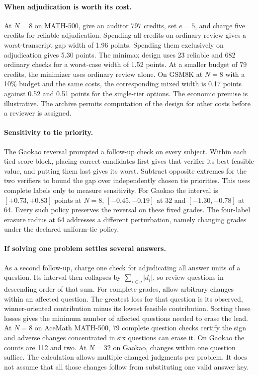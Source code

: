\paragraph{When adjudication is worth its cost.}
At $N=8$ on MATH-500, give an auditor 797 credits, set $e=5$, and charge five credits for reliable adjudication. Spending all credits on ordinary review gives a worst-transcript gap width of 1.96 points. Spending them exclusively on adjudication gives 5.30 points. The minimax design uses 23 reliable and 682 ordinary checks for a worst-case width of 1.52 points. At a smaller budget of 79 credits, the minimizer uses ordinary review alone. On GSM8K at $N=8$ with a 10\% budget and the same costs, the corresponding mixed width is 0.17 points against 0.52 and 0.51 points for the single-tier options. The economic premise is illustrative. The archive permits computation of the design for other costs before a reviewer is assigned.


\paragraph{Sensitivity to tie priority.}
The Gaokao reversal prompted a follow-up check on every subject. Within each tied score block, placing correct candidates first gives that verifier its best feasible value, and putting them last gives its worst. Subtract opposite extremes for the two verifiers to bound the gap over independently chosen tie priorities. This uses complete labels only to measure sensitivity. For Gaokao the interval is $[+0.73,+0.83]$ points at $N=8$, $[-0.45,-0.19]$ at 32 and $[-1.30,-0.78]$ at 64. Every such policy preserves the reversal on these fixed grades. The four-label erasure radius at 64 addresses a different perturbation, namely changing grades under the declared uniform-tie policy.

\paragraph{If solving one problem settles several answers.}
As a second follow-up, charge one check for adjudicating all answer units of a question. Its interval then collapses by $\sum_{i\in q}|d_i|$, so review questions in descending order of that sum. For complete grades, allow arbitrary changes within an affected question. The greatest loss for that question is its observed, winner-oriented contribution minus its lowest feasible contribution. Sorting these losses gives the minimum number of affected questions needed to erase the lead. At $N=8$ on AceMath MATH-500, 79 complete question checks certify the sign and adverse changes concentrated in six questions can erase it. On Gaokao the counts are 112 and two. At $N=32$ on Gaokao, changes within one question suffice. The calculation allows multiple changed judgments per problem. It does not assume that all those changes follow from substituting one valid answer key.

